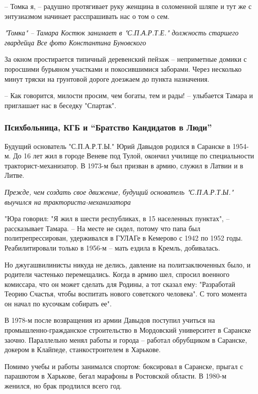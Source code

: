 – Томка я, – радушно протягивает руку женщина в соломенной шляпе и тут же с
энтузиазмом начинает расспрашивать нас о том о сем.
  
\emph{"Томка" – Тамара Костюк занимает в "С.П.А.Р.Т.Е." должность старшего гвардейца
Все фото Константина Буновского}

За окном простирается типичный деревенский пейзаж – неприметные домики с
поросшими бурьяном участками и покосившимися заборами. Через несколько минут
тряски на грунтовой дороге доезжаем до пункта назначения.

– Как говорится, милости просим, чем богаты, тем и рады! – улыбается Тамара и
приглашает нас в беседку "Спартак".

\subsubsection{Психбольница, КГБ и ``Братство Кандидатов в Люди''}

Будущий основатель "С.П.А.Р.Т.Ы." Юрий Давыдов родился в Саранске в 1954-м. До
16 лет жил в городе Веневе под Тулой, окончил училище по специальности
тракторист-механизатор. В 1973-м был призван в армию, служил в Латвии и в
Литве.

{\em
Прежде, чем создать свое движение, будущий основатель "С.П.А.Р.Т.Ы." выучился на тракториста-механизатора
\/}

"Юра говорил: "Я жил в шести республиках, в 15 населенных пунктах", –
рассказывает Тамара. – На месте не сидел, потому что папа был
политрепрессирован, удерживался в ГУЛАГе в Кемерово с 1942 по 1952 годы.
Реабилитировали только в 1956-м – мать ездила в Кремль, добивалась. 

Но джугашвилинисты никуда не делись, давление на политзаключенных было, и
родители частенько перемещались. Когда в армию шел, спросил военного комиссара,
что он может сделать для Родины, а тот сказал ему: "Разработай Теорию Счастья,
чтобы воспитать нового советского человека". С того момента он начал по
кусочкам собирать ее".

В 1978-м после возвращения из армии Давыдов поступил учиться на
промышленно-гражданское строительство в Мордовский университет в Саранске
заочно. Параллельно менял работы и города – работал обрубщиком в Саранске,
докером в Клайпеде, станкостроителем в Харькове. 

Помимо учебы и работы занимался спортом: боксировал в Саранске, прыгал с
парашютом в Харькове, бегал марафоны в Ростовской области. В 1980-м женился, но
брак продлился всего год.

